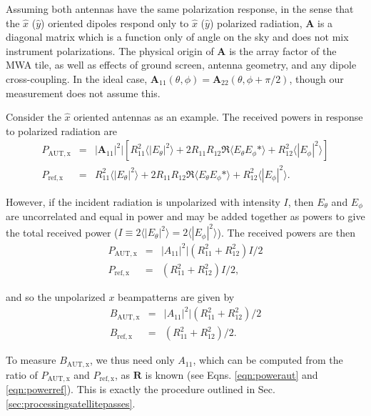 \begin{subappendices}
Assuming both antennas have the same polarization response, in the sense that the $\hat{x}$ ($\hat{y}$) oriented dipoles respond only to $\hat{x}$ ($\hat{y}$) polarized radiation, $\textbf{A}$ is a diagonal matrix which is a function only of angle on the sky and does not mix instrument polarizations. The physical origin of $\textbf{A}$ is the array factor of the MWA tile, as well as effects of ground screen, antenna geometry, and any dipole cross-coupling. In the ideal case, $\textbf{A}_{11}(\theta,\phi)=\textbf{A}_{22}(\theta,\phi+\pi/2)$, though our measurement does not assume this.

Consider the $\hat{x}$ oriented antennas as an example. The received powers in response to polarized radiation are
\begin{eqnarray}
P_\mathrm{AUT,x}&=& |\textbf{A}_{11}|^2|[R_{11}^2\langle|E_\theta|^2\rangle+2R_{11}R_{12}\Re\langle E_\theta E_\phi*\rangle +R_{12}^2\langle|E_\phi|^2\rangle] \\
P_\mathrm{ref,x}&=&R_{11}^2\langle|E_\theta|^2\rangle+2R_{11}R_{12}\Re\langle E_\theta E_\phi*\rangle+R_{12}^2\langle|E_\phi|^2\rangle.
\end{eqnarray}


However, if the incident radiation is unpolarized with intensity $I$, then $E_\theta$ and $E_\phi$ are uncorrelated and equal in power and may be added together as powers to give the total received power ($I\equiv2\langle|E_\theta|^2\rangle=2\langle|E_\phi|^2\rangle$). The received powers are then
 \begin{eqnarray}
P_\mathrm{AUT,x}&=& |A_{11}|^2|(R_{11}^2+R_{12}^2)I/2 \label{eqn:poweraut} \\
P_\mathrm{ref,x}&=&(R_{11}^2+R_{12}^2)I/2 \label{eqn:powerref},
\end{eqnarray}

and so the unpolarized $x$ beampatterns are given by
\begin{eqnarray}
B_\mathrm{AUT,x}&=& |A_{11}|^2|(R_{11}^2+R_{12}^2)/2\label{eqn:autbeam} \\
B_\mathrm{ref,x}&=&(R_{11}^2+R_{12}^2)/2\label{eqn:refbeam}.
\end{eqnarray}

To measure $B_\mathrm{AUT,x}$, we thus need only $A_{11}$, which can be computed from the ratio of $P_\mathrm{AUT,x}$ and $P_\mathrm{ref,x}$, as $\textbf{R}$ is known (see Eqns. \ref{eqn:poweraut} and \ref{eqn:powerref}). This is exactly the procedure outlined in Sec. \ref{sec:processingsatellitepasses}.  


\end{subappendices}
